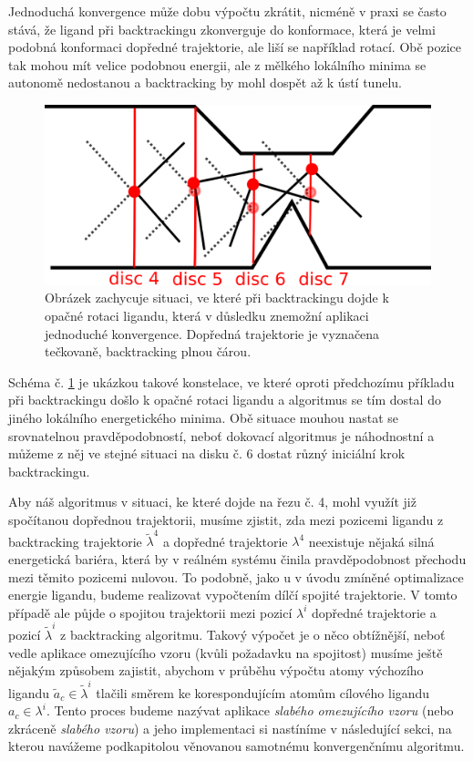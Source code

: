 Jednoduchá konvergence může dobu výpočtu zkrátit, nicméně v praxi se často stává,
že ligand při backtrackingu zkonverguje do konformace, která je velmi podobná
konformaci dopředné trajektorie, ale liší se například rotací. Obě pozice tak
mohou mít velice podobnou energii, ale z mělkého lokálního minima se autonomě
nedostanou a backtracking by mohl dospět až k ústí tunelu.

\begin{figure}[ht]
\centering
\includegraphics[width=.5\hsize]{img/backtracking_bad.png}
\caption{Obrázek zachycuje situaci, ve které při backtrackingu dojde k opačné
rotaci ligandu, která v důsledku znemožní aplikaci jednoduché konvergence.
Dopředná trajektorie je vyznačena tečkovaně, backtracking plnou čárou.
}
\label{fig:backtracking_bad}
\end{figure}

Schéma č. \ref{fig:backtracking_bad} je ukázkou takové konstelace, ve které
oproti předchozímu příkladu při backtrackingu došlo k opačné rotaci ligandu
a algoritmus se tím dostal do jiného lokálního energetického minima. Obě situace
mouhou nastat se srovnatelnou pravděpodobností, neboť dokovací algoritmus je
náhodnostní a můžeme z něj ve stejné situaci na disku č. 6 dostat různý iniciální
krok backtrackingu.

Aby náš algoritmus v situaci, ke které dojde na řezu č. 4, mohl využít již spočítanou
dopřednou trajektorii, musíme zjistit, zda mezi pozicemi ligandu z backtracking trajektorie
$ \tilde{\lambda}^4 $ a dopředné trajektorie $ \lambda^4 $ neexistuje nějaká silná
energetická bariéra, která by v reálném systému činila pravděpodobnost přechodu
mezi těmito pozicemi nulovou. To podobně, jako u v úvodu zmíněné optimalizace
energie ligandu, budeme realizovat vypočtením dílčí spojité trajektorie.
V tomto případě ale půjde o spojitou trajektorii mezi pozicí $ \lambda^i $ dopředné
trajektorie a pozicí $ \tilde{\lambda}^i $ z backtracking algoritmu. Takový
výpočet je o něco obtížnější, neboť vedle aplikace omezujícího vzoru (kvůli
požadavku na spojitost) musíme ještě nějakým způsobem zajistit, abychom v průběhu
výpočtu atomy výchozího ligandu $ \tilde{a}_c \in \tilde{\lambda}^i $ tlačili
směrem ke korespondujícím atomům cílového ligandu $ a_c \in \lambda^i $.
Tento proces budeme nazývat aplikace \textit{slabého omezujícího vzoru} (nebo
zkráceně \textit{slabého vzoru}) a jeho implementaci si nastíníme v následující
sekci, na kterou navážeme podkapitolou věnovanou samotnému konvergenčnímu algoritmu.




